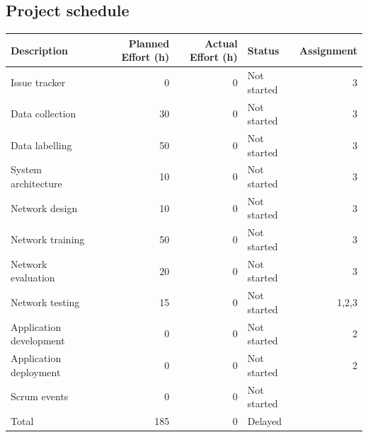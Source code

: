 \documentclass{article}
\begin{document}
\subsection{Project schedule}
\label{sec:org8df338a}

\begin{center}
\begin{tabular}{lrrlr}
Description & Planned Effort (h) & Actual Effort (h) & Status & Assignment\\
\hline
Issue tracker & 0 & 0 & Not started & 3\\
Data collection & 30 & 0 & Not started & 3\\
Data labelling & 50 & 0 & Not started & 3\\
System architecture & 10 & 0 & Not started & 3\\
Network design & 10 & 0 & Not started & 3\\
Network training & 50 & 0 & Not started & 3\\
Network evaluation & 20 & 0 & Not started & 3\\
Network testing & 15 & 0 & Not started & 1,2,3\\
Application development & 0 & 0 & Not started & 2\\
Application deployment & 0 & 0 & Not started & 2\\
Scrum events & 0 & 0 & Not started & \\
\hline
Total & 185 & 0 & Delayed & \\
\end{tabular}
\end{center}
\end{document}
